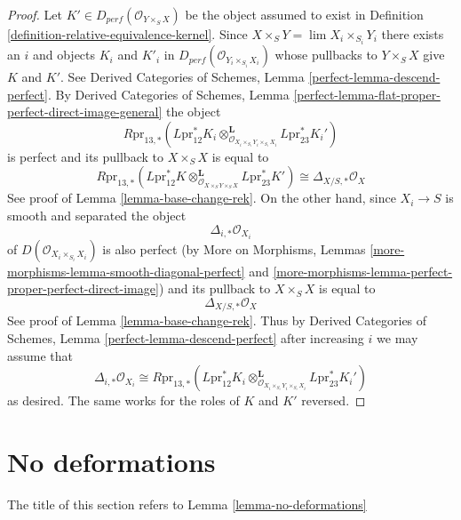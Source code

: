 \begin{proof}
Let $K' \in D_{perf}(\mathcal{O}_{Y \times_S X})$ be the object assumed to
exist in Definition \ref{definition-relative-equivalence-kernel}.
Since $X \times_S Y = \lim X_i \times_{S_i} Y_i$ there exists an
$i$ and objects $K_i$ and $K'_i$ in
$D_{perf}(\mathcal{O}_{Y_i \times_{S_i} X_i})$
whose pullbacks to $Y \times_S X$ give $K$ and $K'$.
See Derived Categories of Schemes, Lemma \ref{perfect-lemma-descend-perfect}.
By Derived Categories of Schemes, Lemma
\ref{perfect-lemma-flat-proper-perfect-direct-image-general}
the object
$$
R\text{pr}_{13, *}(L\text{pr}_{12}^*K_i
\otimes_{\mathcal{O}_{X_i \times_{S_i} Y_i \times_{S_i} X_i}}^\mathbf{L}
L\text{pr}_{23}^*K_i')
$$
is perfect and its pullback to $X \times_S X$ is equal to
$$
R\text{pr}_{13, *}(L\text{pr}_{12}^*K
\otimes_{\mathcal{O}_{X \times_S Y \times_S X}}^\mathbf{L}
L\text{pr}_{23}^*K') \cong \Delta_{X/S, *}\mathcal{O}_X
$$
See proof of Lemma \ref{lemma-base-change-rek}.
On the other hand, since $X_i \to S$ is smooth and separated the
object
$$
\Delta_{i, *}\mathcal{O}_{X_i}
$$
of $D(\mathcal{O}_{X_i \times_{S_i} X_i})$ is also perfect
(by More on Morphisms, Lemmas
\ref{more-morphisms-lemma-smooth-diagonal-perfect} and
\ref{more-morphisms-lemma-perfect-proper-perfect-direct-image}) and
its pullback to $X \times_S X$ is equal to
$$
\Delta_{X/S, *}\mathcal{O}_X
$$
See proof of Lemma \ref{lemma-base-change-rek}. Thus by
Derived Categories of Schemes, Lemma \ref{perfect-lemma-descend-perfect}
after increasing $i$ we may assume that
$$
\Delta_{i, *}\mathcal{O}_{X_i} \cong
R\text{pr}_{13, *}(L\text{pr}_{12}^*K_i
\otimes_{\mathcal{O}_{X_i \times_{S_i} Y_i \times_{S_i} X_i}}^\mathbf{L}
L\text{pr}_{23}^*K_i')
$$
as desired. The same works for the roles of $K$ and $K'$ reversed.
\end{proof}








\section{No deformations}
\label{section-no-deformations}

\noindent
The title of this section refers to Lemma \ref{lemma-no-deformations}

